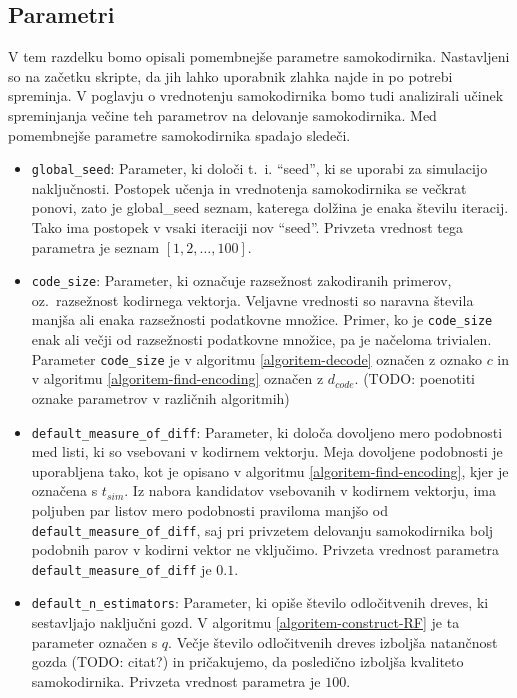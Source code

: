 \documentclass[12pt,a4paper]{article}
\begin{document}

\subsection{Parametri}

V tem razdelku bomo opisali pomembnejše parametre samokodirnika. 
Nastavljeni so na začetku skripte, da jih lahko uporabnik zlahka najde in po potrebi spreminja.
V poglavju o vrednotenju samokodirnika bomo tudi analizirali učinek spreminjanja večine teh parametrov na delovanje samokodirnika.
Med pomembnejše parametre samokodirnika spadajo sledeči.

\begin{itemize}
	\item \texttt{global\_seed}: Parameter, ki določi t.~i. ``seed'', ki se uporabi za simulacijo naključnosti.
	Postopek učenja in vrednotenja samokodirnika se večkrat ponovi, zato je global\_seed seznam, katerega dolžina je enaka številu iteracij.
	Tako ima postopek v vsaki iteraciji nov ``seed''. 
	Privzeta vrednost tega parametra je seznam $[1,2,\ldots,100]$.

	\item \texttt{code\_size}: Parameter, ki označuje razsežnost zakodiranih primerov, oz.\ razsežnost kodirnega vektorja. 
	Veljavne vrednosti so naravna števila manjša ali enaka razsežnosti podatkovne množice.
	Primer, ko je \texttt{code\_size} enak ali večji od razsežnosti podatkovne množice, pa je načeloma trivialen.
	Parameter \texttt{code\_size} je v algoritmu \ref{algoritem-decode} označen z oznako $c$ in v algoritmu \ref{algoritem-find-encoding} označen z $d_{code}$. 
	(TODO: poenotiti oznake parametrov v različnih algoritmih)
	
	\item \texttt{default\_measure\_of\_diff}: Parameter, ki določa dovoljeno mero podobnosti med listi, ki so vsebovani v kodirnem vektorju.
	Meja dovoljene podobnosti je uporabljena tako, kot je opisano v algoritmu \ref{algoritem-find-encoding}, kjer je označena s $t_{\mathit{sim}}$.
	Iz nabora kandidatov vsebovanih v kodirnem vektorju, ima poljuben par listov mero podobnosti praviloma manjšo od \texttt{default\_\-measure\_\-of\_\-diff}, 
	saj pri privzetem delovanju samokodirnika bolj podobnih parov v kodirni vektor ne vključimo.
	Privzeta vrednost parametra \texttt{default\_measure\_of\_diff} je $0.1$. %

	\item \texttt{default\_n\_estimators}: Parameter, ki opiše število odločitvenih dreves, ki sestavljajo naključni gozd. 
	V algoritmu \ref{algoritem-construct-RF} je ta parameter označen s $q$. 
	Večje število odločitvenih dreves izboljša natančnost gozda (TODO: citat?) in pričakujemo, da posledično izboljša kvaliteto samokodirnika.
	Privzeta vrednost parametra je $100$.

\end{itemize}
\end{document}
